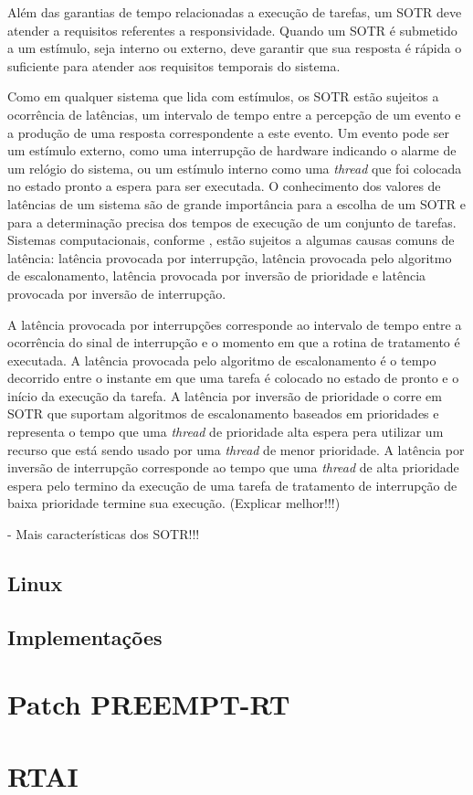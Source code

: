 Além das garantias de tempo relacionadas a execução de tarefas, um SOTR deve atender a requisitos referentes a responsividade. Quando um SOTR é submetido a um estímulo, seja interno ou externo, deve garantir que sua resposta é rápida o suficiente para atender aos requisitos temporais do sistema.

Como em qualquer sistema que lida com estímulos, os SOTR estão sujeitos a ocorrência de latências, um intervalo de tempo entre a percepção de um evento e a produção de uma resposta correspondente a este evento. Um evento pode ser um estímulo externo, como uma interrupção de hardware indicando o alarme de um relógio do sistema, ou um estímulo interno como uma \textit{thread} que foi colocada no estado pronto a espera para ser executada. O conhecimento dos valores de latências de um sistema são de grande importância para a escolha de um SOTR e para a determinação precisa dos tempos de execução de um conjunto de tarefas. Sistemas computacionais, conforme \cite{Rostedt2007}, estão sujeitos a algumas causas comuns de latência: latência provocada por interrupção, latência provocada pelo algoritmo de escalonamento, latência provocada por inversão de prioridade e latência provocada por inversão de interrupção.  

A latência provocada por interrupções corresponde ao intervalo de tempo entre a ocorrência do sinal de interrupção e o momento em que a rotina de tratamento é executada. A latência provocada pelo algoritmo de escalonamento é o tempo decorrido entre o instante em que uma tarefa é colocado no estado de pronto e o início da execução da tarefa. A latência por inversão de prioridade o corre em SOTR que suportam algoritmos de escalonamento baseados em prioridades e representa o tempo que uma \textit{thread} de prioridade alta espera pera utilizar um recurso que está sendo usado por uma \textit{thread} de menor prioridade. A latência por inversão de interrupção corresponde ao tempo que uma \textit{thread} de alta prioridade espera pelo termino da execução de uma tarefa de tratamento de interrupção de baixa prioridade termine sua execução. (Explicar melhor!!!)

- Mais características dos SOTR!!!
\subsection{Linux}
\subsection{Implementações}

\section{Patch PREEMPT-RT}

\section{RTAI}

